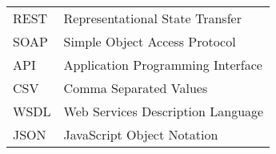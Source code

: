 
\seznamzkr

\begin{tabular}{ll}
  REST & Representational State Transfer \\
  SOAP & Simple Object Access Protocol \\
  API & Application Programming Interface \\
  CSV & Comma Separated Values \\
  WSDL & Web Services Description Language \\
  JSON & JavaScript Object Notation \\
\end{tabular}


